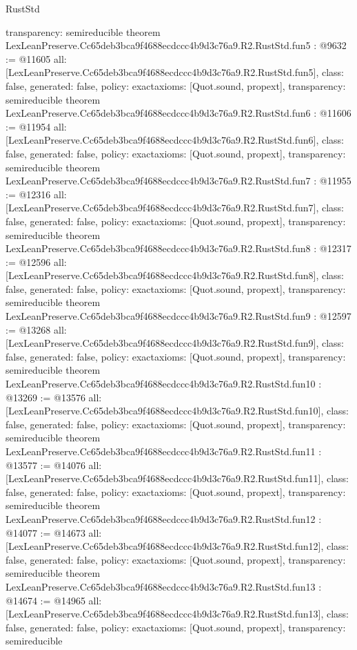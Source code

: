 \begin{lexlean}{RustStd}
\begin{coremodule}
{  transparency: semireducible
}
theorem LexLeanPreserve.Cc65deb3bca9f4688ecdccc4b9d3c76a9.R2.RustStd.fun5 : @9632 := @11605 {
  all: [LexLeanPreserve.Cc65deb3bca9f4688ecdccc4b9d3c76a9.R2.RustStd.fun5],
  class: false,
  generated: false,
  policy: exact{axioms: [Quot.sound, propext]},
  transparency: semireducible
}
theorem LexLeanPreserve.Cc65deb3bca9f4688ecdccc4b9d3c76a9.R2.RustStd.fun6 : @11606 := @11954 {
  all: [LexLeanPreserve.Cc65deb3bca9f4688ecdccc4b9d3c76a9.R2.RustStd.fun6],
  class: false,
  generated: false,
  policy: exact{axioms: [Quot.sound, propext]},
  transparency: semireducible
}
theorem LexLeanPreserve.Cc65deb3bca9f4688ecdccc4b9d3c76a9.R2.RustStd.fun7 : @11955 := @12316 {
  all: [LexLeanPreserve.Cc65deb3bca9f4688ecdccc4b9d3c76a9.R2.RustStd.fun7],
  class: false,
  generated: false,
  policy: exact{axioms: [Quot.sound, propext]},
  transparency: semireducible
}
theorem LexLeanPreserve.Cc65deb3bca9f4688ecdccc4b9d3c76a9.R2.RustStd.fun8 : @12317 := @12596 {
  all: [LexLeanPreserve.Cc65deb3bca9f4688ecdccc4b9d3c76a9.R2.RustStd.fun8],
  class: false,
  generated: false,
  policy: exact{axioms: [Quot.sound, propext]},
  transparency: semireducible
}
theorem LexLeanPreserve.Cc65deb3bca9f4688ecdccc4b9d3c76a9.R2.RustStd.fun9 : @12597 := @13268 {
  all: [LexLeanPreserve.Cc65deb3bca9f4688ecdccc4b9d3c76a9.R2.RustStd.fun9],
  class: false,
  generated: false,
  policy: exact{axioms: [Quot.sound, propext]},
  transparency: semireducible
}
theorem LexLeanPreserve.Cc65deb3bca9f4688ecdccc4b9d3c76a9.R2.RustStd.fun10 : @13269 := @13576 {
  all: [LexLeanPreserve.Cc65deb3bca9f4688ecdccc4b9d3c76a9.R2.RustStd.fun10],
  class: false,
  generated: false,
  policy: exact{axioms: [Quot.sound, propext]},
  transparency: semireducible
}
theorem LexLeanPreserve.Cc65deb3bca9f4688ecdccc4b9d3c76a9.R2.RustStd.fun11 : @13577 := @14076 {
  all: [LexLeanPreserve.Cc65deb3bca9f4688ecdccc4b9d3c76a9.R2.RustStd.fun11],
  class: false,
  generated: false,
  policy: exact{axioms: [Quot.sound, propext]},
  transparency: semireducible
}
theorem LexLeanPreserve.Cc65deb3bca9f4688ecdccc4b9d3c76a9.R2.RustStd.fun12 : @14077 := @14673 {
  all: [LexLeanPreserve.Cc65deb3bca9f4688ecdccc4b9d3c76a9.R2.RustStd.fun12],
  class: false,
  generated: false,
  policy: exact{axioms: [Quot.sound, propext]},
  transparency: semireducible
}
theorem LexLeanPreserve.Cc65deb3bca9f4688ecdccc4b9d3c76a9.R2.RustStd.fun13 : @14674 := @14965 {
  all: [LexLeanPreserve.Cc65deb3bca9f4688ecdccc4b9d3c76a9.R2.RustStd.fun13],
  class: false,
  generated: false,
  policy: exact{axioms: [Quot.sound, propext]},
  transparency: semireducible
}
\end{coremodule}
\end{lexlean}
